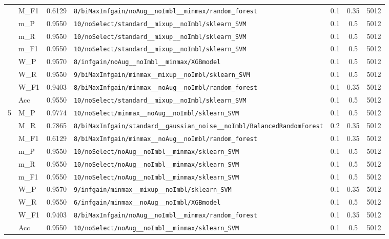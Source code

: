 \begin{table}[htbp]
\begin{tabular}{|c|l|c|>{\ttfamily\footnotesize}p{7.2cm}|c|c|c|}
 & M\_F1 & 0.6129 & \texttt{8/biMaxInfgain/noAug\_\_noImbl\_\_minmax/random\_forest} & 0.1 & 0.35  & 5012 \\ 
 & m\_P & 0.9550 & \texttt{10/noSelect/standard\_\_mixup\_\_noImbl/sklearn\_SVM} & 0.1 & 0.5  & 5012 \\ 
 & m\_R & 0.9550 & \texttt{10/noSelect/standard\_\_mixup\_\_noImbl/sklearn\_SVM} & 0.1 & 0.5  & 5012 \\ 
 & m\_F1 & 0.9550 & \texttt{10/noSelect/standard\_\_mixup\_\_noImbl/sklearn\_SVM} & 0.1 & 0.5  & 5012 \\ 
 & W\_P & 0.9570 & \texttt{8/infgain/noAug\_\_noImbl\_\_minmax/XGBmodel} & 0.1 & 0.5  & 5012 \\ 
 & W\_R & 0.9550 & \texttt{9/biMaxInfgain/minmax\_\_mixup\_\_noImbl/sklearn\_SVM} & 0.1 & 0.5  & 5012 \\ 
 & W\_F1 & 0.9403 & \texttt{8/biMaxInfgain/minmax\_\_noAug\_\_noImbl/random\_forest} & 0.1 & 0.35  & 5012 \\ 
 & Acc & 0.9550 & \texttt{10/noSelect/standard\_\_mixup\_\_noImbl/sklearn\_SVM} & 0.1 & 0.5  & 5012 \\ 
\hline
\multirow{10}{*}{5} & M\_P & 0.9774 & \texttt{10/noSelect/minmax\_\_noAug\_\_noImbl/sklearn\_SVM} & 0.1 & 0.5  & 5012 \\ 
 & M\_R & 0.7865 & \texttt{8/biMaxInfgain/standard\_\_gaussian\_noise\_\_noImbl/BalancedRandomForest} & 0.2 & 0.35  & 5012 \\ 
 & M\_F1 & 0.6129 & \texttt{8/biMaxInfgain/minmax\_\_noAug\_\_noImbl/random\_forest} & 0.1 & 0.35  & 5012 \\ 
 & m\_P & 0.9550 & \texttt{10/noSelect/noAug\_\_noImbl\_\_minmax/sklearn\_SVM} & 0.1 & 0.5  & 5012 \\ 
 & m\_R & 0.9550 & \texttt{10/noSelect/noAug\_\_noImbl\_\_minmax/sklearn\_SVM} & 0.1 & 0.5  & 5012 \\ 
 & m\_F1 & 0.9550 & \texttt{10/noSelect/noAug\_\_noImbl\_\_minmax/sklearn\_SVM} & 0.1 & 0.5  & 5012 \\ 
 & W\_P & 0.9570 & \texttt{9/infgain/minmax\_\_mixup\_\_noImbl/sklearn\_SVM} & 0.1 & 0.35  & 5012 \\ 
 & W\_R & 0.9550 & \texttt{6/infgain/minmax\_\_noAug\_\_noImbl/XGBmodel} & 0.1 & 0.5  & 5012 \\ 
 & W\_F1 & 0.9403 & \texttt{8/biMaxInfgain/noAug\_\_noImbl\_\_minmax/random\_forest} & 0.1 & 0.35  & 5012 \\ 
 & Acc & 0.9550 & \texttt{10/noSelect/noAug\_\_noImbl\_\_minmax/sklearn\_SVM} & 0.1 & 0.5  & 5012 \\ 
\hline
\end{tabular}
\end{table}
